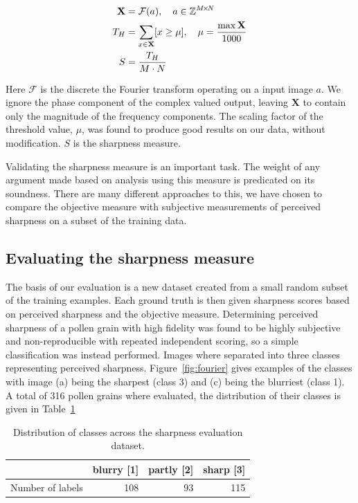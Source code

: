 \begin{equation}\label{eq:sharp}
  \begin{split}
    \mathbf{X} &= \mathcal{F}(a),\quad a\in \mathbb{Z}^{M\!\times \! N}\\
    T_H &= \sum_{x\in\mathbf{X}}[x\ge\mu],\quad \mu=\frac{\max \mathbf{X}}{1000}\\
    S &= \dfrac{T_H}{M\cdot N}
  \end{split}
\end{equation}

Here \(\mathcal{F}\) is the discrete the Fourier transform operating on a input image \(a\). We ignore the phase component of the complex valued output, leaving \(\mathbf{X}\) to contain only the magnitude of the frequency components.
The scaling factor of the threshold value, \(\mu \), was found to produce good results on our data, without modification. \(S\) is the sharpness measure.

Validating the sharpness measure is an important task.
The weight of any argument made based on analysis using this measure is predicated on its soundness.
There are many different approaches to this, we have chosen to compare the objective measure with subjective measurements of perceived sharpness on a subset of the training data.

\subsection{Evaluating the sharpness measure}
The basis of our evaluation is a new dataset created from a small random subset of the training examples.
Each ground truth is then given sharpness scores based on perceived sharpness and the objective measure.
Determining perceived sharpness of a pollen grain with high fidelity was found to be highly subjective and non-reproducible with repeated independent scoring, so a simple classification was instead performed.
Images where separated into three classes representing perceived sharpness.
Figure~\ref{fig:fourier} gives examples of the classes with image (a) being the sharpest (class 3) and (c) being the blurriest (class 1).
A total of 316 pollen grains where evaluated, the distribution of their classes is given in Table~\ref{tab:sharpness}

\begin{table}[htbp]
  \caption[Sharpness dataset distribution]{Distribution of classes across the sharpness evaluation dataset.}\label{tab:sharpness}
  \centering 
  \begin{tabular}{lrrr} \toprule
    & blurry [1] & partly [2] & sharp [3]  \\ \midrule
    Number of labels & 108 & 93 & 115 \\ \bottomrule
  \end{tabular}
\end{table}

